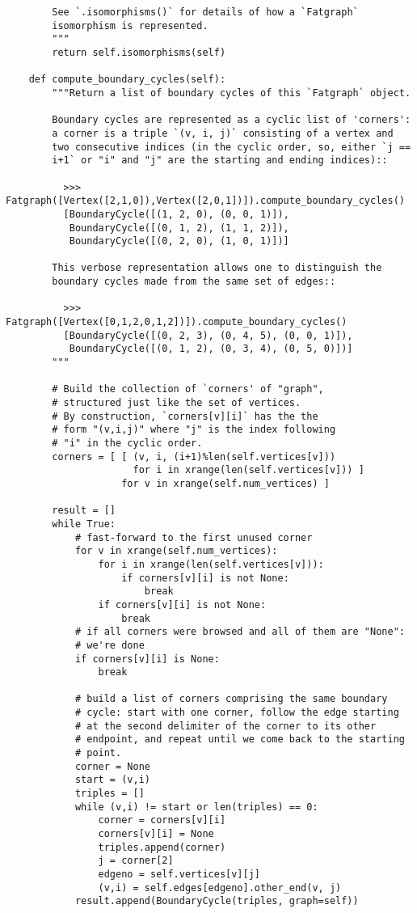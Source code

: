 \begin{lstlisting}
        See `.isomorphisms()` for details of how a `Fatgraph`
        isomorphism is represented.
        """
        return self.isomorphisms(self)

    def compute_boundary_cycles(self):
        """Return a list of boundary cycles of this `Fatgraph` object.

        Boundary cycles are represented as a cyclic list of 'corners':
        a corner is a triple `(v, i, j)` consisting of a vertex and
        two consecutive indices (in the cyclic order, so, either `j ==
        i+1` or "i" and "j" are the starting and ending indices)::
        
          >>> Fatgraph([Vertex([2,1,0]),Vertex([2,0,1])]).compute_boundary_cycles()
          [BoundaryCycle([(1, 2, 0), (0, 0, 1)]),
           BoundaryCycle([(0, 1, 2), (1, 1, 2)]),
           BoundaryCycle([(0, 2, 0), (1, 0, 1)])]

        This verbose representation allows one to distinguish the
        boundary cycles made from the same set of edges::

          >>> Fatgraph([Vertex([0,1,2,0,1,2])]).compute_boundary_cycles()
          [BoundaryCycle([(0, 2, 3), (0, 4, 5), (0, 0, 1)]),
           BoundaryCycle([(0, 1, 2), (0, 3, 4), (0, 5, 0)])]
        """
        
        # Build the collection of `corners' of "graph",
        # structured just like the set of vertices.
        # By construction, `corners[v][i]` has the the
        # form "(v,i,j)" where "j" is the index following
        # "i" in the cyclic order.
        corners = [ [ (v, i, (i+1)%len(self.vertices[v]))
                      for i in xrange(len(self.vertices[v])) ]
                    for v in xrange(self.num_vertices) ]

        result = []
        while True:
            # fast-forward to the first unused corner
            for v in xrange(self.num_vertices):
                for i in xrange(len(self.vertices[v])):
                    if corners[v][i] is not None:
                        break
                if corners[v][i] is not None:
                    break
            # if all corners were browsed and all of them are "None":
            # we're done
            if corners[v][i] is None:
                break

            # build a list of corners comprising the same boundary
            # cycle: start with one corner, follow the edge starting
            # at the second delimiter of the corner to its other
            # endpoint, and repeat until we come back to the starting
            # point.  
            corner = None
            start = (v,i)
            triples = []
            while (v,i) != start or len(triples) == 0:
                corner = corners[v][i]
                corners[v][i] = None
                triples.append(corner)
                j = corner[2]
                edgeno = self.vertices[v][j]
                (v,i) = self.edges[edgeno].other_end(v, j)
            result.append(BoundaryCycle(triples, graph=self))


\end{lstlisting}
